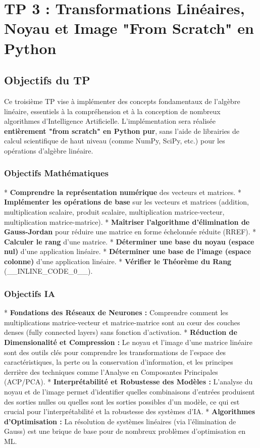 \documentclass{report}
\begin{document}
\newpage
\chapter*{TP 3 : Transformations Linéaires, Noyau et Image "From Scratch" en Python}

\section*{Objectifs du TP}

Ce troisième TP vise à implémenter des concepts fondamentaux de l'algèbre linéaire, essentiels à la compréhension et à la conception de nombreux algorithmes d'Intelligence Artificielle. L'implémentation sera réalisée \textbf{entièrement "from scratch" en Python pur}, sans l'aide de librairies de calcul scientifique de haut niveau (comme NumPy, SciPy, etc.) pour les opérations d'algèbre linéaire.

\subsection*{Objectifs Mathématiques}
*   \textbf{Comprendre la représentation numérique} des vecteurs et matrices.
*   \textbf{Implémenter les opérations de base} sur les vecteurs et matrices (addition, multiplication scalaire, produit scalaire, multiplication matrice-vecteur, multiplication matrice-matrice).
*   \textbf{Maîtriser l'algorithme d'élimination de Gauss-Jordan} pour réduire une matrice en forme échelonnée réduite (RREF).
*   \textbf{Calculer le rang} d'une matrice.
*   \textbf{Déterminer une base du noyau (espace nul)} d'une application linéaire.
*   \textbf{Déterminer une base de l'image (espace colonne)} d'une application linéaire.
*   \textbf{Vérifier le Théorème du Rang} (\_\_INLINE\_CODE\_0\_\_).

\subsection*{Objectifs IA}
*   \textbf{Fondations des Réseaux de Neurones :} Comprendre comment les multiplications matrice-vecteur et matrice-matrice sont au cœur des couches denses (fully connected layers) sans fonction d'activation.
*   \textbf{Réduction de Dimensionalité et Compression :} Le noyau et l'image d'une matrice linéaire sont des outils clés pour comprendre les transformations de l'espace des caractéristiques, la perte ou la conservation d'information, et les principes derrière des techniques comme l'Analyse en Composantes Principales (ACP/PCA).
*   \textbf{Interprétabilité et Robustesse des Modèles :} L'analyse du noyau et de l'image permet d'identifier quelles combinaisons d'entrées produisent des sorties nulles ou quelles sont les sorties possibles d'un modèle, ce qui est crucial pour l'interprétabilité et la robustesse des systèmes d'IA.
*   \textbf{Algorithmes d'Optimisation :} La résolution de systèmes linéaires (via l'élimination de Gauss) est une brique de base pour de nombreux problèmes d'optimisation en ML.
\end{document}
